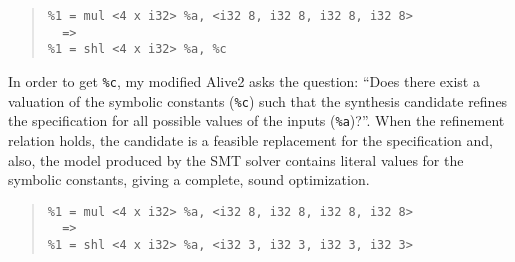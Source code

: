 {\begin{quote}
\begin{verbatim}
%1 = mul <4 x i32> %a, <i32 8, i32 8, i32 8, i32 8>
  =>
%1 = shl <4 x i32> %a, %c
\end{verbatim}
\end{quote}}


In order to get \texttt{\%c}, my modified Alive2 asks the question: ``Does
there exist a valuation of the symbolic constants (\texttt{\%c}) such
that the synthesis candidate refines the specification for all
possible values of the inputs (\texttt{\%a})?''.
%
When the refinement relation holds, the candidate is a feasible
replacement for the specification and, also, the model produced by the
SMT solver contains literal values for the symbolic constants, giving
a complete, sound optimization.

{\begin{quote}
\begin{verbatim}
%1 = mul <4 x i32> %a, <i32 8, i32 8, i32 8, i32 8>
  =>
%1 = shl <4 x i32> %a, <i32 3, i32 3, i32 3, i32 3>
\end{verbatim}
\end{quote}}